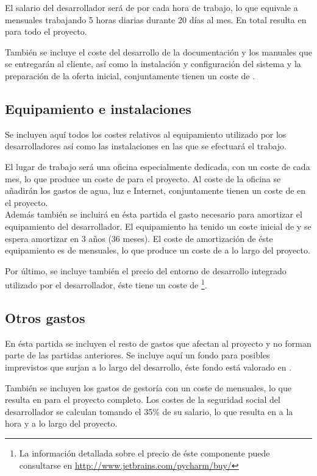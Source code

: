 	El salario del desarrollador será de   por cada hora de trabajo, lo que equivale a   mensuales trabajando 5 horas diarias durante 20 días al mes.  En total resulta en  para todo el proyecto.
	
	También se incluye el coste del desarrollo de la documentación y los manuales que se entregarán al cliente, así como la instalación y configuración del sistema y la preparación de la oferta inicial, conjuntamente tienen un coste de .

\subsection{Equipamiento e instalaciones}
	Se incluyen aquí todos los costes relativos al equipamiento utilizado por los desarrolladores así como las instalaciones en las que se efectuará el trabajo.
	
	El lugar de trabajo será una oficina especialmente dedicada, con un coste de  cada mes, lo que produce un coste de  para el proyecto.  Al coste de la oficina se añadirán los gastos de agua, luz e Internet, conjuntamente tienen un coste de  en el proyecto.\\
	Además también se incluirá en ésta partida el gasto necesario para amortizar el equipamiento del desarrollador.  El equipamiento ha tenido un coste inicial de  y se espera amortizar en 3 años (36 meses).  El coste de amortización de éste equipamiento es de  mensuales, lo que produce un coste de  a lo largo del proyecto.
	
	Por último, se incluye también el precio del entorno de desarrollo integrado utilizado por el desarrollador, éste tiene un coste de \footnote{La información detallada sobre el precio de éste componente puede consultarse en \url{http://www.jetbrains.com/pycharm/buy/}}.
	
\subsection{Otros gastos}
	En ésta partida se incluyen el resto de gastos que afectan al proyecto y no forman parte de las partidas anteriores.  Se incluye aquí un fondo para posibles imprevistos que surjan a lo largo del desarrollo, éste fondo está valorado en .
	
	También se incluyen los gastos de gestoría con un coste de  mensuales, lo que resulta en  para el proyecto completo.  Los costes de la seguridad social del desarrollador se calculan tomando el 35\% de su salario, lo que resulta en  a la hora y  a lo largo del proyecto.